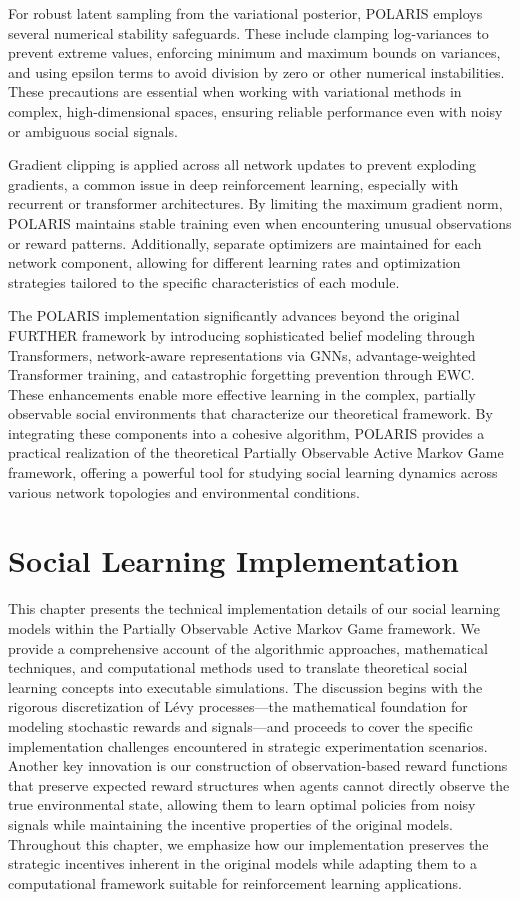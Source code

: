 \documentclass[a4paper,12pt]{report}
\begin{document}
For robust latent sampling from the variational posterior, POLARIS employs several numerical stability safeguards. These include clamping log-variances to prevent extreme values, enforcing minimum and maximum bounds on variances, and using epsilon terms to avoid division by zero or other numerical instabilities. These precautions are essential when working with variational methods in complex, high-dimensional spaces, ensuring reliable performance even with noisy or ambiguous social signals.

Gradient clipping is applied across all network updates to prevent exploding gradients, a common issue in deep reinforcement learning, especially with recurrent or transformer architectures. By limiting the maximum gradient norm, POLARIS maintains stable training even when encountering unusual observations or reward patterns. Additionally, separate optimizers are maintained for each network component, allowing for different learning rates and optimization strategies tailored to the specific characteristics of each module.

The POLARIS implementation significantly advances beyond the original FURTHER framework by introducing sophisticated belief modeling through Transformers, network-aware representations via GNNs, advantage-weighted Transformer training, and catastrophic forgetting prevention through EWC. These enhancements enable more effective learning in the complex, partially observable social environments that characterize our theoretical framework. By integrating these components into a cohesive algorithm, POLARIS provides a practical realization of the theoretical Partially Observable Active Markov Game framework, offering a powerful tool for studying social learning dynamics across various network topologies and environmental conditions.

\chapter{Social Learning Implementation}

This chapter presents the technical implementation details of our social learning models within the Partially Observable Active Markov Game framework. We provide a comprehensive account of the algorithmic approaches, mathematical techniques, and computational methods used to translate theoretical social learning concepts into executable simulations. The discussion begins with the rigorous discretization of Lévy processes—the mathematical foundation for modeling stochastic rewards and signals—and proceeds to cover the specific implementation challenges encountered in strategic experimentation scenarios. Another key innovation is our construction of observation-based reward functions that preserve expected reward structures when agents cannot directly observe the true environmental state, allowing them to learn optimal policies from noisy signals while maintaining the incentive properties of the original models. Throughout this chapter, we emphasize how our implementation preserves the strategic incentives inherent in the original models while adapting them to a computational framework suitable for reinforcement learning applications.
\end{document}

